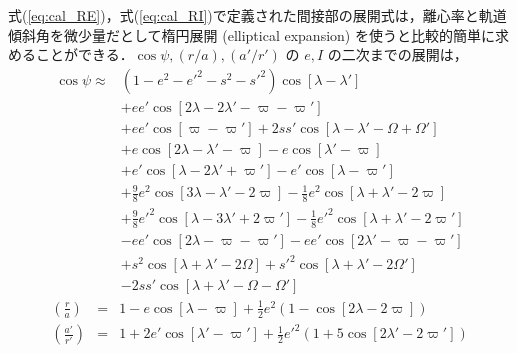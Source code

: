 \documentclass[11pt,a4paper,oneside,onecolumn]{jreport}
\begin{document}
式(\ref{eq:cal_RE})，式(\ref{eq:cal_RI})で定義された間接部の展開式は，離心率と軌道傾斜角を微少量だとして楕円展開 (elliptical expansion) を使うと比較的簡単に求めることができる．$\cos \psi, (r/a), (a'/r')$ の $e, I$ の二次までの展開は，
\begin{equation}
\begin{split}
\cos \psi \approx & (1 - e^2 - e'^2 - s^2 - s'^2) \cos [\lambda - \lambda'] \\
& + e e' \cos [2 \lambda - 2 \lambda' - \varpi - \varpi'] \\
& + e e' \cos [\varpi - \varpi'] + 2 s s' \cos [\lambda - \lambda' - \Omega + \Omega'] \\
& + e \cos [2 \lambda - \lambda' - \varpi] - e \cos [\lambda' - \varpi] \\
& + e' \cos [\lambda - 2 \lambda' + \varpi'] - e' \cos [\lambda - \varpi'] \\
& + \frac{9}{8} e^2 \cos [3 \lambda - \lambda' - 2 \varpi] - \frac{1}{8} e^2 \cos [\lambda + \lambda' - 2 \varpi] \\
& + \frac{9}{8} e'^2 \cos [\lambda - 3 \lambda' + 2 \varpi'] - \frac{1}{8} e'^2 \cos [\lambda + \lambda' - 2 \varpi'] \\
& - e e' \cos [2 \lambda - \varpi - \varpi'] - e e' \cos [2 \lambda' - \varpi - \varpi'] \\
& + s^2 \cos [\lambda + \lambda' - 2 \Omega] + s'^2 \cos [\lambda + \lambda' - 2 \Omega'] \\
& - 2 s s' \cos [\lambda + \lambda' - \Omega - \Omega']
\end{split}
\end{equation}
\begin{eqnarray}
\left( \frac{r}{a} \right) & = & 1 - e \cos [\lambda - \varpi] + \frac{1}{2} e^2 \left(1 - \cos [2 \lambda - 2 \varpi] \right) \\
\left( \frac{a'}{r'} \right) & = & 1 + 2 e' \cos [\lambda' - \varpi'] + \frac{1}{2} e'^2 \left(1 + 5 \cos [2 \lambda' - 2 \varpi'] \right)
\end{eqnarray}
\end{document}
